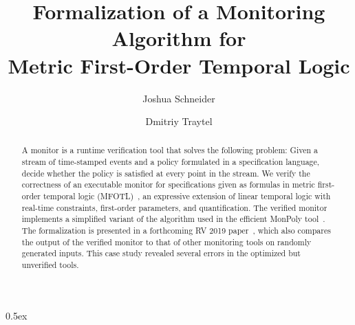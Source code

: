 \documentclass[10pt,a4paper]{article}
\begin{document}
\title{Formalization of a Monitoring Algorithm for\\ Metric First-Order Temporal Logic}
\author{Joshua Schneider \and Dmitriy Traytel}

\maketitle

\begin{abstract} A monitor is a runtime verification tool that solves the following
problem: Given a stream of time-stamped events and a policy formulated in a specification
language, decide whether the policy is satisfied at every point in the stream. We verify
the correctness of an executable monitor for specifications given as formulas in metric
first-order temporal logic (MFOTL)~\cite{BasinKMZ-JACM15}, an expressive extension of
linear temporal logic with real-time constraints, first-order parameters, and
quantification. The verified monitor implements a simplified variant of the algorithm
used in the efficient MonPoly tool~\cite{monpoly}. The formalization is presented in a
forthcoming RV 2019 paper~\cite{SchneiderBKT-RV19}, which also compares the output of the
verified monitor to that of other monitoring tools on randomly generated inputs. This
case study revealed several errors in the optimized but unverified tools. \end{abstract}

\tableofcontents

\parindent 0pt\parskip 0.5ex





\end{document}
